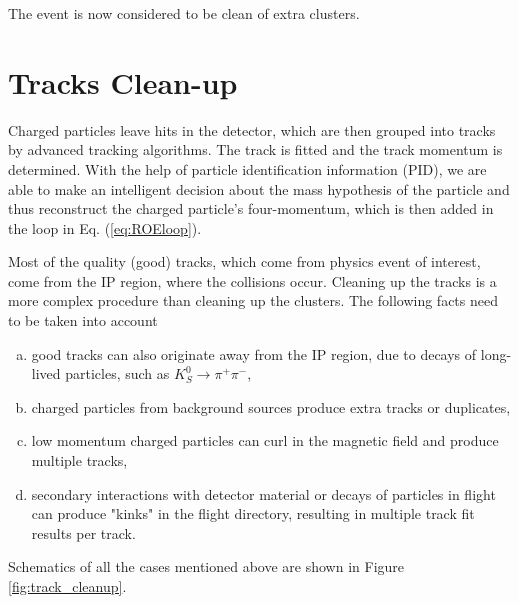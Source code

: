 The event is now considered to be clean of extra clusters.

\section{Tracks Clean-up}

Charged particles leave hits in the detector, which are then grouped into tracks by advanced tracking algorithms. The track is fitted and the track momentum is determined. With the help of particle identification information (PID), we are able to make an intelligent decision about the mass hypothesis of the particle and thus reconstruct the charged particle's four-momentum, which is then added in the loop in Eq. (\ref{eq:ROEloop}).

Most of the quality (good) tracks, which come from physics event of interest, come from the IP region, where the collisions occur. Cleaning up the tracks is a more complex procedure than cleaning up the clusters. The following facts need to be taken into account
\begin{enumerate}[(a)]
	\item good tracks can also originate away from the IP region, due to decays of long-lived particles, such as $K_S^0 \to \pi^+ \pi^-$,
	\item charged particles from background sources produce extra tracks or duplicates,
	\item low momentum charged particles can curl in the magnetic field and produce multiple tracks,
	\item secondary interactions with detector material or decays of particles in flight can produce "kinks" in the flight directory, resulting in multiple track fit results per track.
\end{enumerate}

Schematics of all the cases mentioned above are shown in Figure \ref{fig:track_cleanup}.

